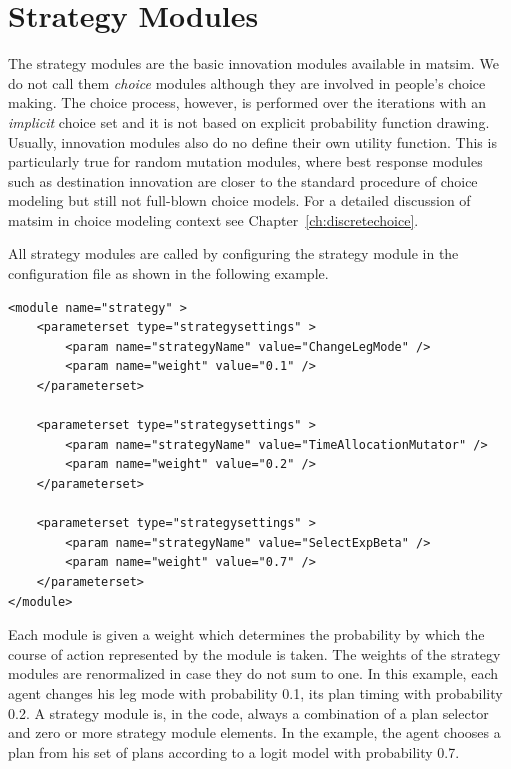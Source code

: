 \section{Strategy Modules}
\label{sec:strategymodules}
The strategy modules are the basic innovation modules available in \gls{matsim}. We do not call them \emph{choice} modules although they are involved in people's choice making. The choice process, however, is performed over the iterations with an \emph{implicit} choice set and it is not based on explicit probability function drawing. Usually, innovation modules also do no define their own utility function. This is particularly true for random mutation modules, where best response modules such as destination innovation are closer to the standard procedure of choice modeling but still not full-blown choice models. For a detailed discussion of \gls{matsim} in choice modeling context see Chapter~\ref{ch:discretechoice}.

All strategy modules are called by configuring the strategy module in the configuration file as shown in the following example.
%
\begin{lstlisting}
<module name="strategy" >
	<parameterset type="strategysettings" >
		<param name="strategyName" value="ChangeLegMode" />
		<param name="weight" value="0.1" />
	</parameterset>
	
	<parameterset type="strategysettings" >
		<param name="strategyName" value="TimeAllocationMutator" />
		<param name="weight" value="0.2" />
	</parameterset>
	
	<parameterset type="strategysettings" >
		<param name="strategyName" value="SelectExpBeta" />
		<param name="weight" value="0.7" />
	</parameterset>
</module>
\end{lstlisting}
%
Each module is given a weight which determines the probability by which the course of action represented by the module is taken. The weights of the strategy modules are renormalized in case they do not sum to one. In this example, each agent changes his leg mode with probability 0.1, its plan timing with probability 0.2. A strategy module is, in the code, always a combination of a plan selector and zero or more strategy module elements. In the example, the agent chooses a plan from his set of plans according to a logit model with probability 0.7. 

